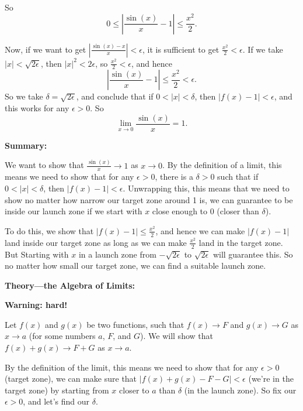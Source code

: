 \documentclass{article}
\begin{document}
So
\[0\leq \left|\frac{\sin(x)}{x}-1\right|\leq\frac{x^2}{2}.\]

Now, if we want to get $\left|\frac{\sin(x)-x}{x}\right|<\epsilon$, it is sufficient to get $\frac{x^2}{2}<\epsilon$. If we take $|x|<\sqrt{2\epsilon}$, then $|x|^2<2\epsilon$, so $\frac{x^2}{2}<\epsilon$, and hence
\[\left|\frac{\sin(x)}{x}-1\right|\leq\frac{x^2}{2}<\epsilon.\]
So we take $\delta=\sqrt{2\epsilon}$, and conclude that if $0<|x|<\delta$, then $|f(x)-1|<\epsilon$, and this works for any $\epsilon>0$. So
\[\lim_{x\to 0}\frac{\sin(x)}{x} = 1.\]

\vspace{5mm}

\textbf{Summary:}\medskip

We want to show that $\frac{\sin(x)}{x}\to 1$ as $x\to 0$. By the definition of a limit, this means we need to show that for any $\epsilon>0$, there is a $\delta>0$ such that if $0<|x|<\delta$, then $|f(x)-1|<\epsilon$. Unwrapping this, this means that we need to show no matter how narrow our target zone around 1 is, we can guarantee to be inside our launch zone if we start with $x$ close enough to 0 (closer than $\delta$).

To do this, we show that $|f(x)-1|\leq \frac{x^2}{2}$, and hence we can make $|f(x)-1|$ land inside our target zone as long as we can make $\frac{x^2}{2}$ land in the target zone. But Starting with $x$ in a launch zone from $-\sqrt{2\epsilon}$ to $\sqrt{2\epsilon}$ will guarantee this. So no matter how small our target zone, we can find a suitable launch zone.\bigskip















\clearpage


\textbf{Theory---the Algebra of Limits:}\medskip

\textbf{Warning: hard!}\medskip


Let $f(x)$ and $g(x)$ be two functions, such that $f(x)\to F$ and $g(x)\to G$ as $x\to a$ (for some numbers $a$, $F$, and $G$). We will show that $f(x)+g(x)\to F+G$ as $x\to a$.

By the definition of the limit, this means we need to show that for any $\epsilon>0$ (target zone), we can make sure that $|f(x)+g(x)-F-G|<\epsilon$ (we're in the target zone) by starting from $x$ closer to $a$ than $\delta$ (in the launch zone). So fix our $\epsilon>0$, and let's find our $\delta$.
\end{document}
